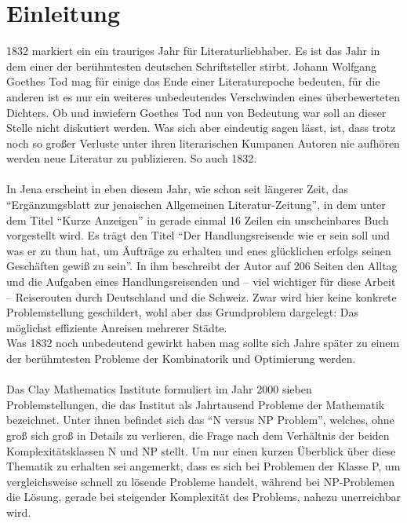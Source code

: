 \chapter{Einleitung}
1832 markiert ein ein trauriges Jahr für Literaturliebhaber.
Es ist das Jahr in dem einer der berühmtesten deutschen Schriftsteller stirbt.
Johann Wolfgang Goethes Tod\autocite[110]{Scholte.1951} mag für einige das Ende einer Literaturepoche bedeuten, für die anderen ist es nur ein weiteres unbedeutendes Verschwinden eines überbewerteten Dichters.
Ob und inwiefern Goethes Tod nun von Bedeutung war soll an dieser Stelle nicht diskutiert werden.
Was sich aber eindeutig sagen lässt, ist, dass trotz noch so großer Verluste unter ihren literarischen Kumpanen Autoren nie aufhören werden neue Literatur zu publizieren. 
So auch 1832.
\\\\
In Jena erscheint in eben diesem Jahr, wie schon seit längerer Zeit, das \enquote{Ergänzungsblatt zur jenaischen Allgemeinen Literatur-Zeitung}\autocite[232]{o.A..1832}, in dem unter dem Titel \enquote{Kurze Anzeigen} in gerade einmal 16 Zeilen ein unscheinbares Buch vorgestellt wird.
Es trägt den Titel \enquote{Der Handlungsreisende wie er sein soll und was er zu thun hat, um Äufträge zu erhalten und enes glücklichen erfolgs seinen Geschäften gewiß zu sein}.
In ihm beschreibt der Autor auf 206 Seiten den Alltag und die Aufgaben eines Handlungsreisenden und -- viel wichtiger für diese Arbeit -- Reiserouten durch Deutschland und die Schweiz.
Zwar wird hier keine konkrete Problemstellung geschildert, wohl aber das Grundproblem dargelegt: Das möglichst effiziente Anreisen mehrerer Städte.
\\
Was 1832 noch unbedeutend gewirkt haben mag sollte sich Jahre später zu einem der berühmtesten Probleme der Kombinatorik und Optimierung werden.
\\\\
Das Clay Mathematics Institute formuliert im Jahr 2000 sieben Problemstellungen, die das Institut als Jahrtausend Probleme der Mathematik bezeichnet.\autocite{o.A..o.J.}
Unter ihnen befindet sich das \enquote{N versus NP Problem}\autocite{Stephen.o.J.}, welches, ohne groß sich groß in Details zu verlieren, die Frage nach dem Verhältnis der beiden Komplexitätsklassen N und NP stellt.
Um nur einen kurzen Überblick über diese Thematik zu erhalten sei angemerkt, dass es sich bei Problemen der Klasse P, um vergleichsweise schnell zu lösende Probleme handelt, während bei NP-Problemen die Lösung, gerade bei steigender Komplexität des Problems, nahezu unerreichbar wird.
